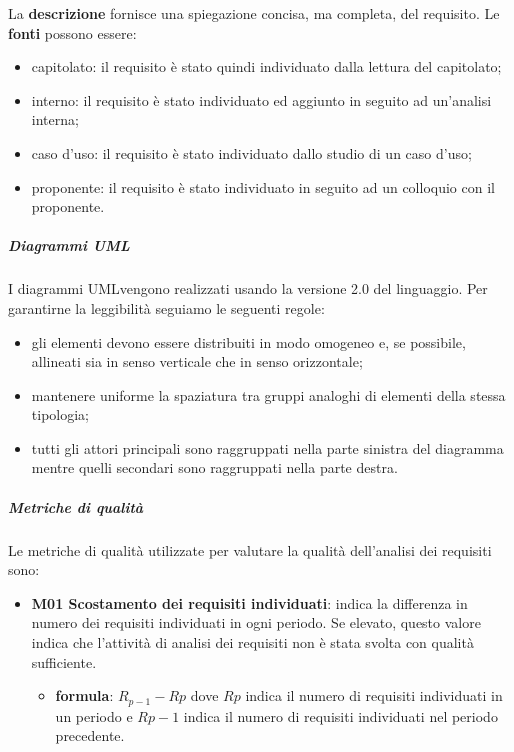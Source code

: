 		La \textbf{descrizione} fornisce una spiegazione concisa, ma completa, del requisito.
		Le \textbf{fonti} possono essere:
		\begin{itemize}
			\item capitolato\glo: il requisito è stato quindi individuato dalla lettura del capitolato\glo;
			\item interno: il requisito è stato individuato ed aggiunto in seguito ad un'analisi interna;
			\item caso d'uso\glo: il requisito è stato individuato dallo studio di un caso d'uso\glo;
			\item proponente: il requisito è stato individuato in seguito ad un colloquio con il proponente.
		\end{itemize}
		\subparagraph*{Diagrammi UML}
		\label{UML}
		I diagrammi UML\glosp vengono realizzati usando la versione 2.0 del linguaggio. Per garantirne la leggibilità seguiamo le seguenti regole:
		\begin{itemize}
			\item gli elementi devono essere distribuiti in modo omogeneo e, se possibile, allineati sia in senso verticale che in senso orizzontale;
			\item mantenere uniforme la spaziatura tra gruppi analoghi di elementi della stessa tipologia;
			\item tutti gli attori principali sono raggruppati nella parte sinistra del diagramma mentre quelli secondari sono raggruppati nella parte destra.
		\end{itemize}
		\subparagraph{Metriche di qualità} 
		Le metriche di qualità utilizzate per valutare la qualità dell'analisi dei requisiti sono:
		\begin{itemize}
			\item \textbf{M01 Scostamento dei requisiti individuati}: indica la differenza in numero dei requisiti individuati in ogni periodo. Se elevato, questo valore indica che l'attività di analisi dei requisiti non è stata svolta con qualità sufficiente.
			\begin{itemize}
				\item[] \textbf{formula}: $R_{p-1}-R{p}$ dove $R{p}$ indica il numero di requisiti individuati in un periodo e $R{p-1}$ indica il numero di requisiti individuati nel periodo precedente.
			\end{itemize} 
		\end{itemize}		
		\pagebreak
